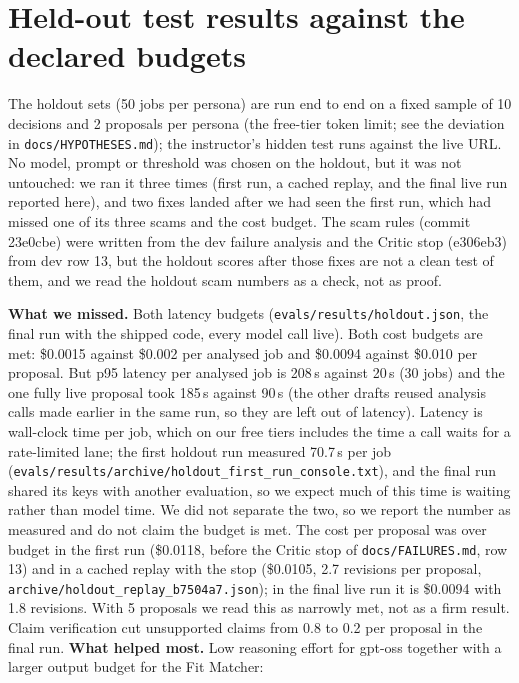 \documentclass[10pt,a4paper]{article}
\newcommand{\file}[1]{\texttt{\small #1}}
\newcommand{\tablefrom}[2]{\begin{table}[h]\centering\caption{#2}\end{table}}
\begin{document}
\section{Held-out test results against the declared budgets}\label{sec:holdout}
The holdout sets (50 jobs per persona) are run end to end on a fixed sample of 10 decisions and 2 proposals per persona
(the free-tier token limit; see the deviation in \file{docs/HYPOTHESES.md}); the instructor's hidden test runs against
the live URL. No model, prompt or threshold was chosen on the holdout, but it was not untouched: we ran it three times
(first run, a cached replay, and the final live run reported here), and two fixes landed after we had seen the first
run, which had missed one of its three scams and the cost budget. The scam rules (commit 23e0cbe) were written from the
dev failure analysis and the Critic stop (e306eb3) from dev row 13, but the holdout scores after those fixes are not a
clean test of them, and we read the holdout scam numbers as a check, not as proof.
\tablefrom{holdout}{Declared budgets against measured values on the holdout set.}
\tablefrom{decisions}{Decision quality on the dev set.}
\textbf{What we missed.} Both latency budgets (\file{evals/results/holdout.json}, the final run with the shipped code,
every model call live). Both cost budgets are met: \$0.0015 against \$0.002 per analysed job and \$0.0094 against
\$0.010 per proposal. But p95 latency per analysed job is 208\,s against 20\,s (30 jobs) and the one fully live
proposal took 185\,s against 90\,s (the other drafts reused analysis calls made earlier in the same run, so they are
left out of latency). Latency is wall-clock time per job, which on our free tiers includes the time a call waits for
a rate-limited lane; the first holdout run measured 70.7\,s per job
(\file{evals/results/archive/holdout\_first\_run\_console.txt}), and the final run shared its keys with another
evaluation, so we expect much of this time is waiting rather than model time. We did not separate the two, so we report
the number as measured and do not claim the budget is met. The cost per proposal was over budget in the first run (\$0.0118, before
the Critic stop of \file{docs/FAILURES.md}, row 13) and in a cached replay with the stop (\$0.0105, 2.7 revisions per
proposal, \file{archive/holdout\_replay\_b7504a7.json}); in the final live run it is \$0.0094 with 1.8 revisions. With 5 proposals we read this as narrowly met,
not as a firm result. Claim verification cut unsupported claims from 0.8 to 0.2 per proposal in the final run.
\textbf{What helped most.} Low reasoning effort for gpt-oss together with a larger output budget for the Fit Matcher:
\end{document}
